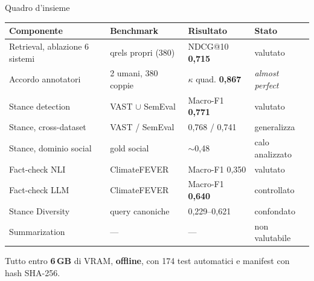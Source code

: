 \documentclass[aspectratio=169,11pt]{beamer}
\begin{document}
\begin{frame}{Quadro d'insieme}
  \centering\footnotesize
  \begin{tabular}{llll}
    \toprule
    \textbf{Componente} & \textbf{Benchmark} & \textbf{Risultato} & \textbf{Stato} \\
    \midrule
    Retrieval, ablazione 6 sistemi & qrels propri (380) & NDCG@10 \textbf{0,715} & valutato \\
    Accordo annotatori & 2 umani, 380 coppie & $\kappa$ quad. \textbf{0,867} & \emph{almost perfect} \\
    Stance detection & VAST $\cup$ SemEval & Macro-F1 \textbf{0,771} & valutato \\
    Stance, cross-dataset & VAST / SemEval & 0,768 / 0,741 & generalizza \\
    Stance, dominio social & gold social & $\sim$0,48 & calo analizzato \\
    Fact-check NLI & ClimateFEVER & Macro-F1 0,350 & valutato \\
    Fact-check LLM & ClimateFEVER & Macro-F1 \textbf{0,640} & controllato \\
    Stance Diversity & query canoniche & 0,229--0,621 & confondato \\
    Summarization & --- & --- & non valutabile \\
    \bottomrule
  \end{tabular}
  \vspace{0.8em}

  {\footnotesize Tutto entro \textbf{6\,GB} di VRAM, \textbf{offline}, con 174 test
  automatici e manifest con hash SHA-256.}
\end{frame}
\end{document}
